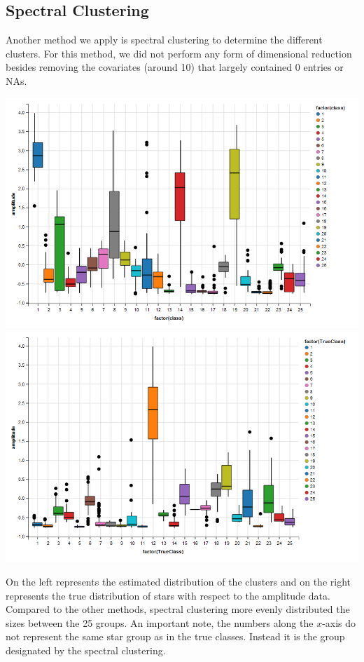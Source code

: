 \documentclass[12pt]{article}
\begin{document}
\subsection{Spectral Clustering}
Another method we apply is spectral clustering to determine the different clusters. For this method, we did not perform any form of dimensional reduction besides removing the covariates (around 10) that largely contained 0 entries or NAs.  
\begin{center}
\includegraphics[scale=0.38]{estimated.png}
\includegraphics[scale=0.38]{trueclass.png}
\end{center}
On the left represents the estimated distribution of the clusters and on the right represents the true distribution of stars with respect to the amplitude data. 
Compared to the other methods, spectral clustering more evenly distributed the sizes between the 25 groups. An important note, the numbers along the $x$-axis do not represent the same star group as in the true classes. Instead it is the group designated by the spectral clustering. 
\end{document}
